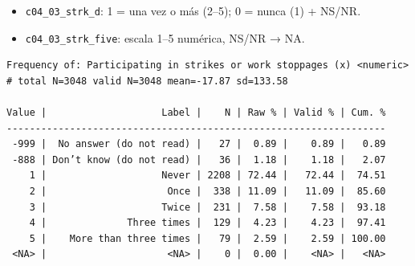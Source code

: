 \documentclass[
  letterpaper,
  DIV=11,
  numbers=noendperiod]{scrreprt}
\newenvironment{Shaded}{\begin{snugshade}}{\end{snugshade}}
\newcommand{\AttributeTok}[1]{\textcolor[rgb]{0.40,0.45,0.13}{#1}}
\newcommand{\DecValTok}[1]{\textcolor[rgb]{0.68,0.00,0.00}{#1}}
\newcommand{\FunctionTok}[1]{\textcolor[rgb]{0.28,0.35,0.67}{#1}}
\newcommand{\NormalTok}[1]{\textcolor[rgb]{0.00,0.23,0.31}{#1}}
\newcommand{\OtherTok}[1]{\textcolor[rgb]{0.00,0.23,0.31}{#1}}
\newcommand{\SpecialCharTok}[1]{\textcolor[rgb]{0.37,0.37,0.37}{#1}}
\newcommand{\StringTok}[1]{\textcolor[rgb]{0.13,0.47,0.30}{#1}}
\providecommand{\tightlist}{%
  \setlength{\itemsep}{0pt}\setlength{\parskip}{0pt}}
\begin{document}
\begin{itemize}
\tightlist
\item
  \texttt{c04\_03\_strk\_d}: 1 = una vez o más (2--5); 0 = nunca (1) +
  NS/NR.
\item
  \texttt{c04\_03\_strk\_five}: escala 1--5 numérica, NS/NR → NA.
\end{itemize}

\begin{Shaded}
\end{Shaded}

\begin{verbatim}
Frequency of: Participating in strikes or work stoppages (x) <numeric> 
# total N=3048 valid N=3048 mean=-17.87 sd=133.58

Value |                    Label |    N | Raw % | Valid % | Cum. %
------------------------------------------------------------------
 -999 |  No answer (do not read) |   27 |  0.89 |    0.89 |   0.89
 -888 | Don’t know (do not read) |   36 |  1.18 |    1.18 |   2.07
    1 |                    Never | 2208 | 72.44 |   72.44 |  74.51
    2 |                     Once |  338 | 11.09 |   11.09 |  85.60
    3 |                    Twice |  231 |  7.58 |    7.58 |  93.18
    4 |              Three times |  129 |  4.23 |    4.23 |  97.41
    5 |    More than three times |   79 |  2.59 |    2.59 | 100.00
 <NA> |                     <NA> |    0 |  0.00 |    <NA> |   <NA>
\end{verbatim}

\begin{Shaded}
\end{Shaded}
\end{document}
